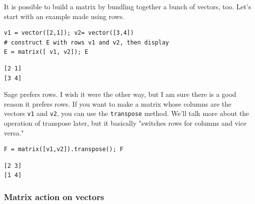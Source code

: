 \documentclass[10pt,]{book}
\theoremstyle{plain}
\theoremstyle{definition}
\numberwithin{equation}{section}
\begin{document}
        It is possible to build a matrix by bundling together a bunch of vectors,
        too. Let's start with an example made using rows.
\begin{lstlisting}[style=sageinput]
v1 = vector([2,1]); v2= vector([3,4])
# construct E with rows v1 and v2, then display
E = matrix([ v1, v2]); E
\end{lstlisting}
\begin{lstlisting}[style=sageoutput]
[2 1]
[3 4]
\end{lstlisting}
\par

        Sage prefers rows. I wish it were the other way, but I am sure there is
        a good reason it prefers rows. If you want to make a matrix whose columns
        are the vectors \verb?v1? and \verb?v2?, you can use the
        \verb?transpose? method. We'll talk more about the operation of transpose
        later, but it basically "switches rows for columns and vice versa."
\begin{lstlisting}[style=sageinput]
F = matrix([v1,v2]).transpose(); F
\end{lstlisting}
\begin{lstlisting}[style=sageoutput]
[2 3]
[1 4]
\end{lstlisting}
\typeout{************************************************}
\typeout{************************************************}
\subsubsection[Matrix action on vectors]{Matrix action on vectors}\label{subsubsection-9}
\end{document}
